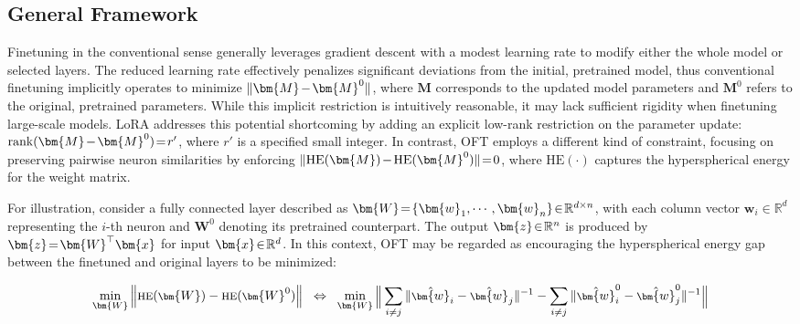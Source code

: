 \subsection{General Framework}

Finetuning in the conventional sense generally leverages gradient descent with a modest learning rate to modify either the whole model or selected layers. The reduced learning rate effectively penalizes significant deviations from the initial, pretrained model, thus conventional finetuning implicitly operates to minimize $\thickmuskip=2mu \medmuskip=2mu \| \bm{M} - \bm{M}^0\|$, where $\bm{M}$ corresponds to the updated model parameters and $\bm{M}^0$ refers to the original, pretrained parameters. While this implicit restriction is intuitively reasonable, it may lack sufficient rigidity when finetuning large-scale models. LoRA addresses this potential shortcoming by adding an explicit low-rank restriction on the parameter update: $\thickmuskip=2mu \medmuskip=2mu \text{rank}(\bm{M} - \bm{M}^0)=r'$, where $r'$ is a specified small integer. In contrast, OFT employs a different kind of constraint, focusing on preserving pairwise neuron similarities by enforcing $\thickmuskip=2mu \medmuskip=2mu \| \text{HE}(\bm{M})-\text{HE}(\bm{M}^0) \|=0$, where $\text{HE}(\cdot)$ captures the hyperspherical energy for the weight matrix. 

For illustration, consider a fully connected layer described as $\thickmuskip=2mu \medmuskip=2mu \bm{W}=\{\bm{w}_1,\cdots,\bm{w}_n\}\in\mathbb{R}^{d\times n}$, with each column vector $\bm{w}_i\in\mathbb{R}^{d}$ representing the $i$-th neuron and $\bm{W}^0$ denoting its pretrained counterpart. The output $\thickmuskip=2mu \medmuskip=2mu \bm{z}\in\mathbb{R}^n$ is produced by $\thickmuskip=2mu \medmuskip=2mu \bm{z}=\bm{W}^\top\bm{x}$ for input $\thickmuskip=2mu \medmuskip=2mu \bm{x}\in\mathbb{R}^d$. In this context, OFT may be regarded as encouraging the hyperspherical energy gap between the finetuned and original layers to be minimized:

\begin{equation}\label{eq:oft_principle}
\footnotesize
\min_{\bm{W}} \left\| \text{HE}(\bm{W})-\text{HE}(\bm{W}^0)\right\|~~\Leftrightarrow~~\min_{\bm{W}} \bigg{\|} \sum_{i\neq j} \|\hat{\bm{w}}_i-\hat{\bm{w}}_j\|^{-1}-\sum_{i\neq j} \|\hat{\bm{w}}^0_i-\hat{\bm{w}}^0_j\|^{-1}\bigg{\|}
\end{equation}

